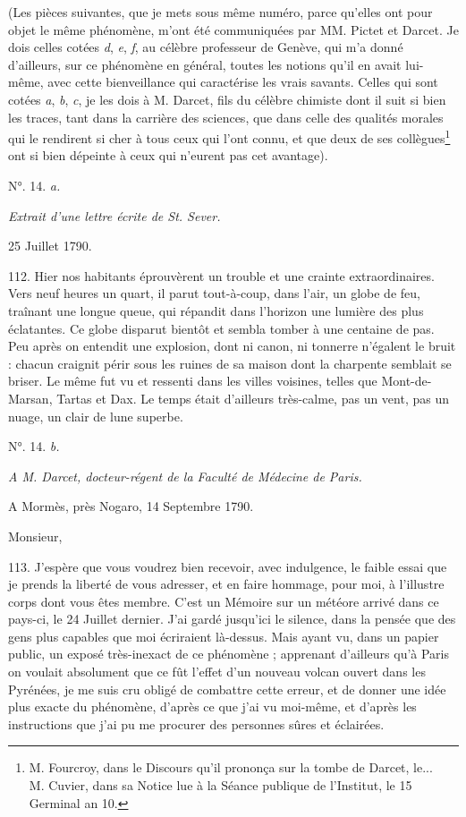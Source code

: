 \documentclass[a4paper, 11pt, oneside, polutonikogreek, french]{article}
\begin{document}
(Les pièces suivantes, que je mets sous même numéro, parce qu'elles ont pour objet le même phénomène, m'ont été communiquées par MM. Pictet et Darcet. Je dois celles cotées \emph{d}, \emph{e}, \emph{f}, au célèbre professeur de Genève, qui m'a donné d'ailleurs, sur ce phénomène en général, toutes les notions qu'il en avait lui-même, avec cette bienveillance qui caractérise les vrais savants. Celles qui sont cotées \emph{a}, \emph{b}, \emph{c}, je les dois à M. Darcet, fils du célèbre chimiste dont il suit si bien les traces, tant dans la carrière des sciences, que dans celle des qualités morales qui le rendirent si cher à tous ceux qui l'ont connu, et que deux de ses collègues\footnote{M. Fourcroy, dans le Discours qu'il prononça sur la tombe de Darcet, le...\\
M. Cuvier, dans sa Notice lue à la Séance publique de l'Institut, le 15 Germinal an 10.} ont si bien dépeinte à ceux qui n'eurent pas cet avantage).

\begin{center}
N°. 14. \emph{a.}
\end{center}

\emph{Extrait d'une lettre écrite de St. Sever.}

25 Juillet 1790.

112. \og Hier nos habitants éprouvèrent un trouble et une crainte extraordinaires. Vers neuf heures un quart, il parut tout-à-coup, dans l'air, un globe de feu, traînant une longue queue, qui répandit dans l'horizon une lumière des plus éclatantes. Ce globe disparut bientôt et sembla tomber à une centaine de pas. Peu après on entendit une explosion, dont ni canon, ni tonnerre n'égalent le bruit : chacun craignit périr sous les ruines de sa maison dont la charpente semblait se briser. Le même fut vu et ressenti dans les villes voisines, telles que Mont-de-Marsan, Tartas et Dax. Le temps était d'ailleurs très-calme, pas un vent, pas un nuage, un clair de lune superbe. \fg

\begin{center}
N°. 14. \emph{b.}
\end{center}

\emph{A M. Darcet, docteur-régent de la Faculté de Médecine de Paris.}

A Mormès, près Nogaro, 14 Septembre 1790.

Monsieur,

113. \og J'espère que vous voudrez bien recevoir, avec indulgence, le faible essai que je prends la liberté de vous adresser, et en faire hommage, pour moi, à l'illustre corps dont vous êtes membre. C'est un Mémoire sur un météore arrivé dans ce pays-ci, le 24 Juillet dernier. J'ai gardé jusqu'ici le silence, dans la pensée que des gens plus capables que moi écriraient là-dessus. Mais ayant vu, dans un papier public, un exposé très-inexact de ce phénomène ; apprenant d'ailleurs qu'à Paris on voulait absolument que ce fût l'effet d'un nouveau volcan ouvert dans les Pyrénées, je me suis cru obligé de combattre cette erreur, et de donner une idée plus exacte du phénomène, d'après ce que j'ai vu moi-même, et d'après les instructions que j'ai pu me procurer des personnes sûres et éclairées. \fg
\end{document}
